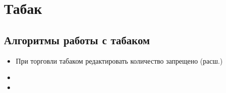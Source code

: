 \section{Табак}
\subsection{Алгоритмы работы с табаком}


\begin{itemize}
	\item При торговли табаком редактировать количество запрещено
		(расш.)
    	\item
	\item
\end{itemize}


